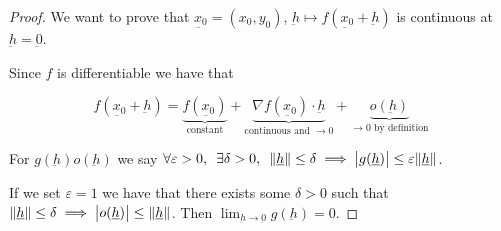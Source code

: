 \documentclass[10pt]{extarticle}
\renewcommand{\vec}[1]{\underbar{\ensuremath{#1}}}
\begin{document}
\begin{proof}
    We want to prove that $\vec{x_0} = (x_0, y_0)$, $\vec{h} \mapsto f(\vec{x_0} + \vec{h})$ is continuous at $\vec{h} = \vec{0}$.

    Since $f$ is differentiable we have that

    $$
        f(\vec{x_0} + \vec{h}) =
        \underbrace{f(\vec{x_0})}_{\text{constant}}
        + \underbrace{\nabla f(\vec{x_0}) \cdot \vec{h}}_{\text{continuous and } \to 0}
        + \underbrace{o(\vec{h})}_{\to 0 \text{ by definition}}
    $$

    For $g(\vec{h}) o(\vec{h})$ we say $\forall \varepsilon > 0, \enspace \exists \delta > 0, \enspace \norm{\vec{h}} \leq \delta \implies \abs{g(\vec{h})} \leq \varepsilon \norm{\vec{h}}$.

    If we set $\varepsilon = 1$ we have that there exists some $\delta > 0$ such that
    $\norm{\vec{h}} \leq \delta \implies \abs{o(\vec{h})} \leq \norm{\vec{h}}$.
    Then $\lim_{\vec{h} \to \vec{0}} g(\vec{h}) = 0$.

\end{proof}
\end{document}
